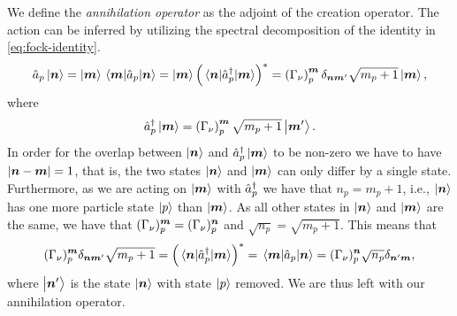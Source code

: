             We define the \emph{annihilation operator} as the adjoint of the
            creation operator.
            The action can be inferred by utilizing the spectral decomposition
            of the identity in \autoref{eq:fock-identity}.
            \begin{align}
                \hat{a}_{p}\ket{\boldsymbol{n}}
                = \ket{\boldsymbol{m}}\mel{\boldsymbol{m}}{\hat{a}_{p}}{\boldsymbol{n}}
                =
                \ket{\boldsymbol{m}}
                \left( 
                    \mel{\boldsymbol{n}}{\hat{a}_{p}^{\dagger}}{\boldsymbol{m}}
                 \right)^{*}
                = \left( \Gamma_{\nu} \right)^{\boldsymbol{m}}_{p}
                \delta_{\boldsymbol{n}\boldsymbol{m}'}
                \sqrt{m_p + 1}
                \ket{\boldsymbol{m}},
            \end{align}
            where
            \begin{align}
                \hat{a}_{p}^{\dagger}\ket{\boldsymbol{m}}
                = \left( \Gamma_{\nu} \right)^{\boldsymbol{m}}_{p}
                \sqrt{m_p + 1}
                \ket{\boldsymbol{m}'}.
            \end{align}
            In order for the overlap between $\ket{\boldsymbol{n}}$ and
            $\hat{a}_{p}^{\dagger}\ket{\boldsymbol{m}}$ to be non-zero we have to have $\abs{\boldsymbol{n}
            - \boldsymbol{m}} = 1$, that is, the two states $\ket{\boldsymbol{n}}$ and
            $\ket{\boldsymbol{m}}$ can only differ by a single state.
            Furthermore, as we are acting on $\ket{\boldsymbol{m}}$ with $\hat{a}_{p}^{\dagger}$ we
            have that $n_p = m_p + 1$, i.e., $\ket{\boldsymbol{n}}$ has one more
            particle state $\ket{p}$ than $\ket{\boldsymbol{m}}$.
            As all other states in $\ket{\boldsymbol{n}}$ and $\ket{\boldsymbol{m}}$ are the
            same, we have that $(\Gamma_{\nu})^{\boldsymbol{m}}_{p} =
            (\Gamma_{\nu})^{\boldsymbol{n}}_{p}$
            and $\sqrt{n_p} = \sqrt{m_p + 1}$.
            This means that
            \begin{align}
                (\Gamma_{\nu})^{\boldsymbol{m}}_{p}
                \delta_{\boldsymbol{n}\boldsymbol{m}'}
                \sqrt{m_p + 1}
                =
                \left( \mel{\boldsymbol{n}}{\hat{a}_{p}^{\dagger}}{\boldsymbol{m}} \right)^{*}
                =
                \mel{\boldsymbol{m}}{\hat{a}_{p}}{\boldsymbol{n}}
                =
                (\Gamma_{\nu})^{\boldsymbol{n}}_{p}
                \sqrt{n_p}
                \delta_{\boldsymbol{n}'\boldsymbol{m}},
            \end{align}
            where $\ket{\boldsymbol{n}'}$ is the state $\ket{\boldsymbol{n}}$ with state
            $\ket{p}$ removed.
            We are thus left with our annihilation operator.
